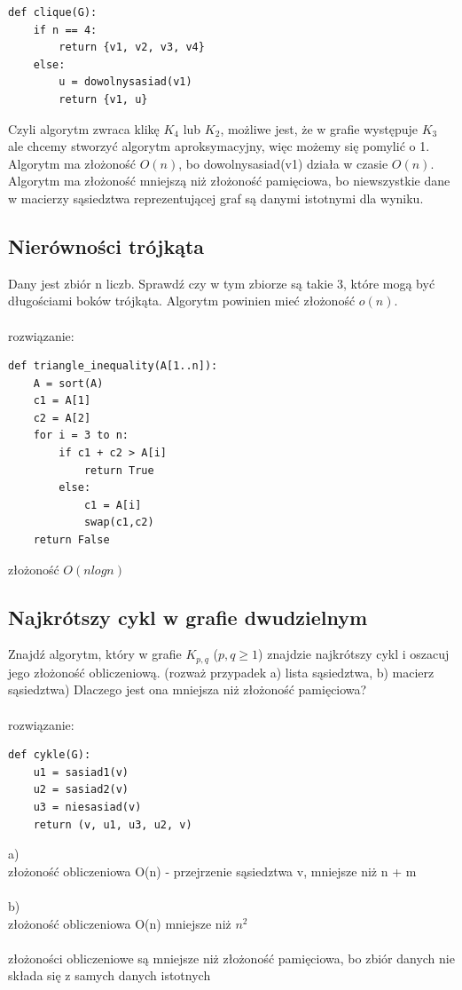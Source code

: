 \documentclass{article}
\begin{document}
\begin{lstlisting}
def clique(G):
	if n == 4:
		return {v1, v2, v3, v4}
	else:
		u = dowolnysasiad(v1)
		return {v1, u}
\end{lstlisting}
Czyli algorytm zwraca klikę $K_4$ lub $K_2$,  możliwe jest, że w grafie występuje $K_3$ ale chcemy stworzyć algorytm aproksymacyjny, więc możemy się pomylić o 1.
Algorytm ma złożoność $O(n)$, bo dowolnysasiad(v1) działa w czasie $O(n)$. Algorytm ma złożoność mniejszą niż złożoność pamięciowa, bo niewszystkie dane w macierzy 
sąsiedztwa reprezentującej graf są danymi istotnymi dla wyniku.

\subsection*{Nierówności trójkąta}
Dany jest zbiór n liczb. Sprawdź czy w tym zbiorze są takie 3, które mogą być długościami boków trójkąta. Algorytm powinien mieć złożoność $o(n)$. \\\\rozwiązanie:\\
\begin{lstlisting}
def triangle_inequality(A[1..n]):
	A = sort(A)
	c1 = A[1]
	c2 = A[2]
	for i = 3 to n:
		if c1 + c2 > A[i]
			return True
		else:
			c1 = A[i]
			swap(c1,c2)			
	return False

\end{lstlisting}
złożoność $O(nlogn)$

\subsection*{Najkrótszy cykl w grafie dwudzielnym}
Znajdź algorytm,  który w grafie $K_{p,q}$ ($p,q \ge 1$) znajdzie najkrótszy cykl i oszacuj jego złożoność obliczeniową.  
(rozważ przypadek a) lista sąsiedztwa, b) macierz sąsiedztwa)
Dlaczego jest ona mniejsza niż złożoność pamięciowa? \\\\rozwiązanie:\\
\begin{lstlisting}
def cykle(G):
	u1 = sasiad1(v)
	u2 = sasiad2(v)
	u3 = niesasiad(v)
	return (v, u1, u3, u2, v)
\end{lstlisting}
a)\\
złożoność obliczeniowa O(n) - przejrzenie sąsiedztwa v,  mniejsze niż n + m \\\\
b)\\
złożoność obliczeniowa O(n) mniejsze niż $n^2$ \\\\
złożoności obliczeniowe są mniejsze niż złożoność pamięciowa, bo zbiór danych nie składa się z samych danych istotnych
\end{document}
